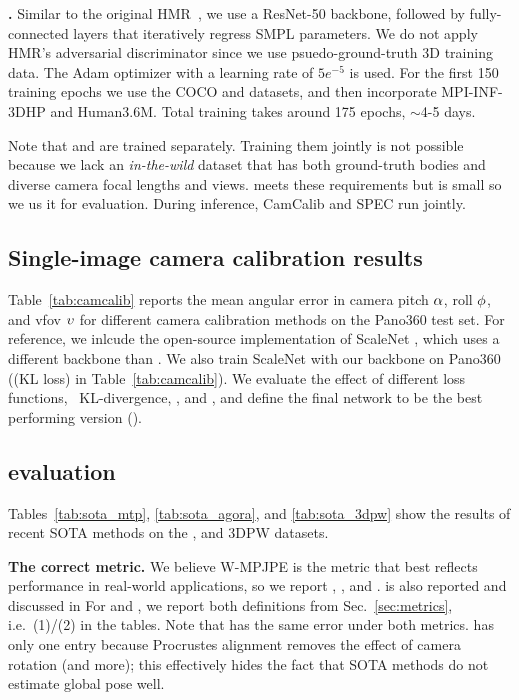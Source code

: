 \documentclass[10pt,twocolumn,letterpaper,usenames,dvipsnames]{article}
\begin{document}
\textbf{\methodname.} 
Similar to the original HMR~\cite{kanazawa_hmr}, we use a ResNet-50 backbone, followed by fully-connected layers that iteratively regress SMPL parameters. 
We do not apply HMR's adversarial discriminator since we use psuedo-ground-truth 3D training data. 
The Adam optimizer with a learning rate of $5e^{-5}$ is used. 
For the first 150 training epochs we use the COCO and \agoracam datasets, and then incorporate MPI-INF-3DHP and Human3.6M. 
Total training takes around 175 epochs, $\sim$4-5 days.

Note that \camcalib and \methodname are trained separately. 
Training them jointly is not possible because we lack an \emph{in-the-wild} dataset that has both ground-truth bodies and diverse camera focal lengths and views.
\mtpcam meets these requirements but is small so we us it for evaluation. During inference, CamCalib and SPEC run jointly.

\subsection{Single-image camera calibration results}
Table~\ref{tab:camcalib} reports the mean angular error in camera pitch $\alpha$, roll $\phi$, and vfov $\upsilon$ for different camera calibration methods on the Pano360 test set.
For reference, we inlcude the open-source implementation of ScaleNet \cite{zhu2020single}, which uses a different backbone than \camcalib.
We also train ScaleNet with our backbone on Pano360 (\camcalib (KL loss) in Table~\ref{tab:camcalib}).
We evaluate the effect of different loss functions, \ie~KL-divergence, \softltwo, and \softbiasedltwo, and define the final \camcalib network to be the best performing version (\softbiasedltwo).








\subsection{\methodname evaluation}
Tables~\ref{tab:sota_mtp}, \ref{tab:sota_agora}, and \ref{tab:sota_3dpw} show the results of recent SOTA methods on the \mtpcam, \agoracam and 3DPW datasets. 

{\bf The correct metric.} 
We believe W-MPJPE is the metric that best reflects performance in real-world applications, so we report \wmpjpe, \pampjpe, and \wpve. \mpjpe is also reported and discussed in \supmat
For \wmpjpe and \wpve, we report both definitions from Sec.~\ref{sec:metrics}, i.e.~(1)/(2) in the tables.
Note that \methodname has the same error under both metrics.
\pampjpe has only one entry because Procrustes alignment removes the effect of camera rotation (and more); this effectively hides the fact that SOTA methods do not estimate global pose well.
\end{document}

